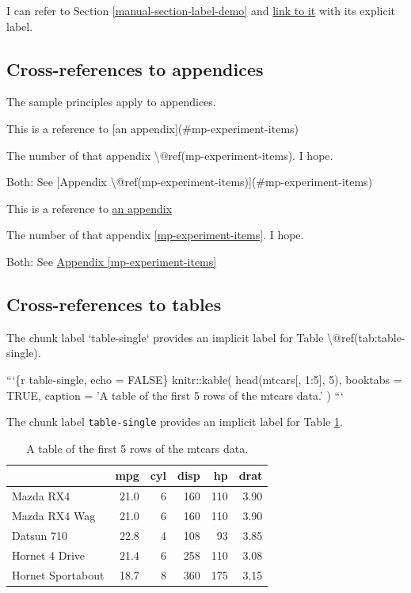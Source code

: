 \documentclass [11pt, proquest] {uwthesis}[2015/03/03]
\newenvironment{Shaded}{}{}
\newcommand{\BaseNTok}[1]{\textcolor[rgb]{0.25,0.63,0.44}{{#1}}}
\newcommand{\OtherTok}[1]{\textcolor[rgb]{0.00,0.44,0.13}{{#1}}}
\newcommand{\NormalTok}[1]{{#1}}
\begin{document}
I can refer to Section \ref{manual-section-label-demo} and
\protect\hyperlink{manual-section-label-demo}{link to it} with its
explicit label.

\subsection{Cross-references to
appendices}\label{cross-references-to-appendices}

The sample principles apply to appendices.
\begin{Shaded}
\begin{Highlighting}[]
\NormalTok{This is a reference to }\OtherTok{[an appendix](#mp-experiment-items)}

\NormalTok{The number of that appendix \textbackslash{}@ref(mp-experiment-items). I hope.}

\NormalTok{Both: See }\OtherTok{[Appendix \textbackslash{}@ref(mp-experiment-items)](#mp-experiment-items)}
\end{Highlighting}
\end{Shaded}
This is a reference to \protect\hyperlink{mp-experiment-items}{an
appendix}

The number of that appendix \ref{mp-experiment-items}. I hope.

Both: See \protect\hyperlink{mp-experiment-items}{Appendix
\ref{mp-experiment-items}}

\subsection{Cross-references to
tables}\label{cross-references-to-tables}
\begin{Shaded}
\begin{Highlighting}[]
\NormalTok{The chunk label }\BaseNTok{`table-single`}\NormalTok{ provides an implicit label }
\NormalTok{for Table \textbackslash{}@ref(tab:table-single).}

\NormalTok{```\{r table-single, echo = FALSE\}}
\NormalTok{knitr::kable(}
\NormalTok{  head(mtcars[, 1:5], 5), booktabs = TRUE,}
\NormalTok{  caption = 'A table of the first 5 rows of the mtcars data.'}
\NormalTok{)}
\NormalTok{```}
\end{Highlighting}
\end{Shaded}
The chunk label \texttt{table-single} provides an implicit label for
Table \ref{tab:table-single}.
\begin{table}

\caption{\label{tab:table-single}A table of the first 5 rows of the mtcars data.}
\centering
\begin{tabular}[t]{lrrrrr}
\toprule
  & mpg & cyl & disp & hp & drat\\
\midrule
Mazda RX4 & 21.0 & 6 & 160 & 110 & 3.90\\
Mazda RX4 Wag & 21.0 & 6 & 160 & 110 & 3.90\\
Datsun 710 & 22.8 & 4 & 108 & 93 & 3.85\\
Hornet 4 Drive & 21.4 & 6 & 258 & 110 & 3.08\\
Hornet Sportabout & 18.7 & 8 & 360 & 175 & 3.15\\
\bottomrule
\end{tabular}
\end{table}
\end{document}
